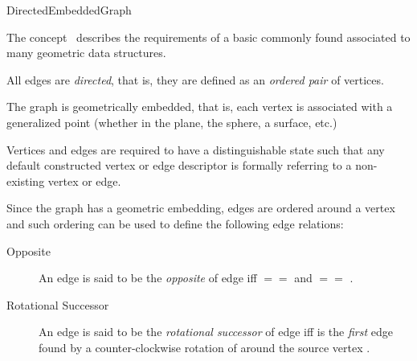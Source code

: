 
\begin{ccRefConcept}{DirectedEmbeddedGraph}


\ccDefinition

The concept \ccRefName\ describes the requirements of a basic
commonly found associated to many geometric data structures.


All edges are {\em directed}, that is, they are defined as an {\em ordered pair} 
of vertices.

The graph is geometrically embedded, that is, each vertex is associated with
 a generalized point (whether in the plane, the sphere, a surface, etc.)

Vertices and edges are required to have a distinguishable  state 
such that any default constructed vertex or edge descriptor is formally
referring to a non-existing vertex or edge.

Since the graph has a geometric embedding, edges are ordered around a vertex 
and such ordering can be used to define the following edge relations:

\begin{description}

\item[Opposite] 
An edge  is said to be the {\em opposite} of edge  
iff  $==$  and  $==$ .

\item[Rotational Successor] 
An edge  is said to be the {\em rotational successor} 
of edge  iff  is the {\em first} edge found by 
a counter-clockwise rotation of  around the source vertex .
 

\end{description}
\end{ccRefConcept}
